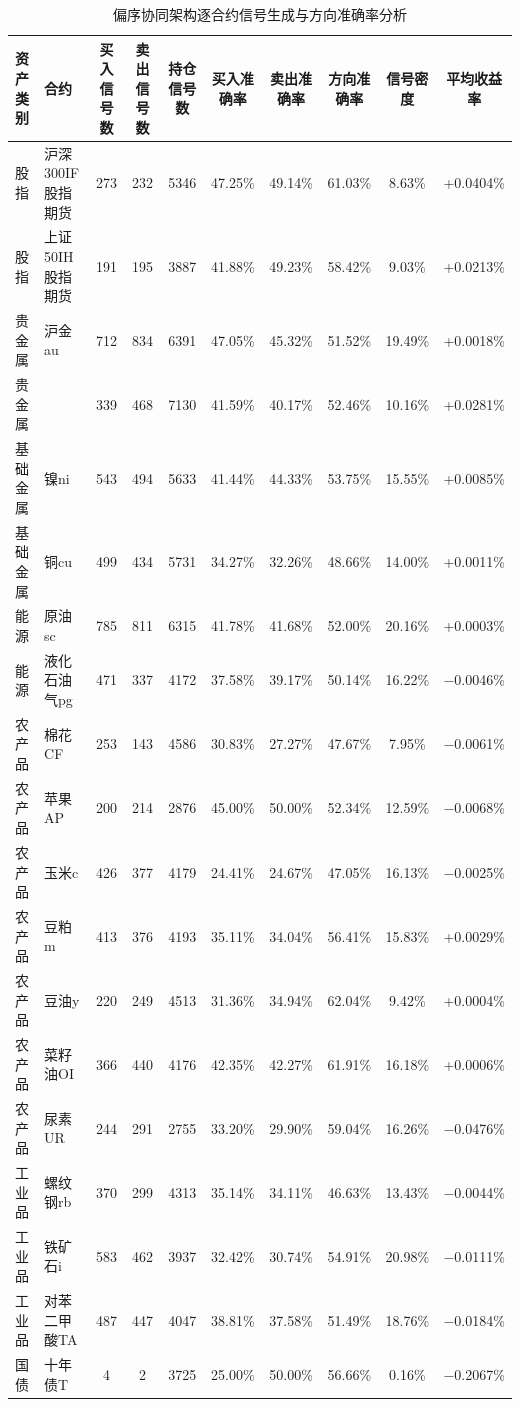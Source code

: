 \begin{table}
\centering
\footnotesize
\caption{偏序协同架构逐合约信号生成与方向准确率分析}
\label{tab:gcaSignalGeneration}
\begin{tabular}{llcccccccc}
\toprule
\textbf{资产类别} & \textbf{合约} & \textbf{买入信号数} & \textbf{卖出信号数} & \textbf{持仓信号数} & \textbf{买入准确率} & \textbf{卖出准确率} & \textbf{方向准确率} & \textbf{信号密度} & \textbf{平均收益率} \\
\midrule
股指 & 沪深300IF股指期货 & 273 & 232 & 5346 & 47.25\% & 49.14\% & 61.03\% & 8.63\% & +0.0404\% \\
股指 & 上证50IH股指期货 & 191 & 195 & 3887 & 41.88\% & 49.23\% & 58.42\% & 9.03\% & +0.0213\% \\
贵金属 & 沪金au & 712 & 834 & 6391 & 47.05\% & 45.32\% & 51.52\% & 19.49\% & +0.0018\% \\
贵金属 &  & 339 & 468 & 7130 & 41.59\% & 40.17\% & 52.46\% & 10.16\% & +0.0281\% \\
基础金属 & 镍ni & 543 & 494 & 5633 & 41.44\% & 44.33\% & 53.75\% & 15.55\% & +0.0085\% \\
基础金属 & 铜cu & 499 & 434 & 5731 & 34.27\% & 32.26\% & 48.66\% & 14.00\% & +0.0011\% \\
能源 & 原油sc & 785 & 811 & 6315 & 41.78\% & 41.68\% & 52.00\% & 20.16\% & +0.0003\% \\
能源 & 液化石油气pg & 471 & 337 & 4172 & 37.58\% & 39.17\% & 50.14\% & 16.22\% & $-$0.0046\% \\
农产品 & 棉花CF & 253 & 143 & 4586 & 30.83\% & 27.27\% & 47.67\% & 7.95\% & $-$0.0061\% \\
农产品 & 苹果AP & 200 & 214 & 2876 & 45.00\% & 50.00\% & 52.34\% & 12.59\% & $-$0.0068\% \\
农产品 & 玉米c & 426 & 377 & 4179 & 24.41\% & 24.67\% & 47.05\% & 16.13\% & $-$0.0025\% \\
农产品 & 豆粕m & 413 & 376 & 4193 & 35.11\% & 34.04\% & 56.41\% & 15.83\% & +0.0029\% \\
农产品 & 豆油y & 220 & 249 & 4513 & 31.36\% & 34.94\% & 62.04\% & 9.42\% & +0.0004\% \\
农产品 & 菜籽油OI & 366 & 440 & 4176 & 42.35\% & 42.27\% & 61.91\% & 16.18\% & +0.0006\% \\
农产品 & 尿素UR & 244 & 291 & 2755 & 33.20\% & 29.90\% & 59.04\% & 16.26\% & $-$0.0476\% \\
工业品 & 螺纹钢rb & 370 & 299 & 4313 & 35.14\% & 34.11\% & 46.63\% & 13.43\% & $-$0.0044\% \\
工业品 & 铁矿石i & 583 & 462 & 3937 & 32.42\% & 30.74\% & 54.91\% & 20.98\% & $-$0.0111\% \\
工业品 & 对苯二甲酸TA & 487 & 447 & 4047 & 38.81\% & 37.58\% & 51.49\% & 18.76\% & $-$0.0184\% \\
国债 & 十年债T & 4 & 2 & 3725 & 25.00\% & 50.00\% & 56.66\% & 0.16\% & $-$0.2067\% \\
\bottomrule
\end{tabular}
\vspace{0.2cm}


\end{table}

